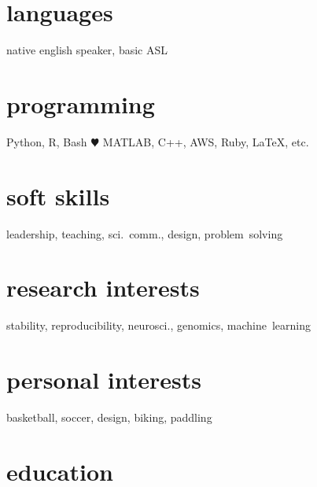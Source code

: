 \documentclass[]{friggeri-cv} %
\begin{document}
\begin{aside}
\section{languages}
native english speaker,
basic ASL
\section{programming}
Python, R, Bash {\color{red} $\varheartsuit$}
MATLAB, C++, AWS,
Ruby, LaTeX, etc.
\section{soft skills}
leadership, teaching, sci.~comm., design, problem~solving
\section{research interests}
stability, reproducibility, neurosci., genomics, machine~learning
\section{personal interests}
basketball, soccer, design, biking, paddling
\end{aside}


\section{education}
\end{document}
